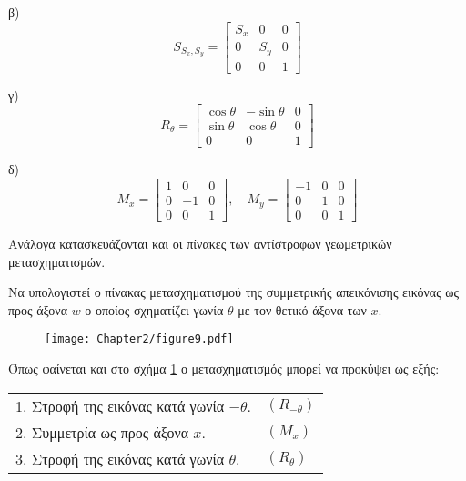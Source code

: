  β)  
\[
S_{S_x,S_y} = \begin{bmatrix} S_x & 0 & 0 \\ 0 & S_y & 0 \\ 0 & 0 & 1 \end{bmatrix}
\]

 γ)
\[
R_{\theta} = \begin{bmatrix} \cos\theta & -\sin\theta & 0 \\ \sin\theta & \cos\theta & 0 \\ 0 & 0 & 1 \end{bmatrix}
\]

 δ) 
\[
M_x = \begin{bmatrix} 1 & 0 & 0 \\ 0 & -1 & 0 \\ 0 & 0 & 1 \end{bmatrix}, \quad M_y = \begin{bmatrix} -1 & 0 & 0 \\ 0 & 1 & 0 \\ 0 & 0 & 1 \end{bmatrix}
\]

 Ανάλογα κατασκευάζονται και οι πίνακες των αντίστροφων γεωμετρικών μετασχηματισμών.

\begin{example}
Να υπολογιστεί ο πίνακας μετασχηματισμού της συμμετρικής απεικόνισης εικόνας ως προς άξονα \( w \) ο οποίος σχηματίζει γωνία \( \theta \) με τον θετικό άξονα των \( x. \)
\end{example}

\begin{figure}[h!]
	\begin{center}
	    \texttt{[image: Chapter2/figure9.pdf]}
	\end{center}
	\label{fig:9}
	\caption{}
\end{figure}



Όπως φαίνεται και στο σχήμα \ref{fig:9} ο μετασχηματισμός μπορεί να προκύψει ως εξής:
 
\begin{tabular}{m{}m{}}
	1. Στροφή της εικόνας κατά γωνία \( -\theta \). & \( (R_{-\theta}) \) \\
	2. Συμμετρία ως προς άξονα $x$.& \( (M_x) \)\\
	3.  Στροφή της εικόνας κατά γωνία \( \theta \).& \( (R_{\theta}) \)
\end{tabular}



